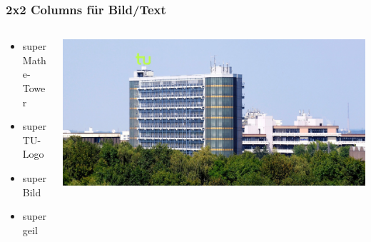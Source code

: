\documentclass{beamer}
\begin{document}
\begin{frame}
    \frametitle{2x2 Columns für Bild/Text}
    \begin{columns}[T]
        \begin{column}{0.5\textwidth}
            \begin{itemize}%
            \item super Mathe-Tower
            \item super TU-Logo
            \item super Bild
            \item super geil
        \end{itemize}
        \end{column}
        \begin{column}{0.5\textwidth}
            \includegraphics[width=\textwidth]{./Title-Pic.jpg}
        \end{column}
    \end{columns}
\end{frame}
\end{document}
